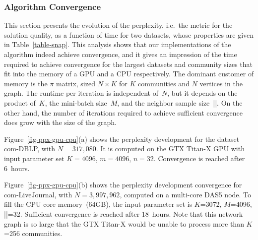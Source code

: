 
\begin{comment}
\begin{figure}[t]	%
  \centering
  \epsfig{file=plots/ppx-gpu.eps, width=\columnwidth}
  \caption{Perplexity convergence of com-DBLP on the GTX~Titan-X~GPU. Number
  of communities chosen to maximally fill the GPU memory.}
  \label{fig-ppx-gpu}
\end{figure}

\begin{figure}[t]	%
  \centering
  \epsfig{file=plots/ppx-cpu.eps, width=\columnwidth}
  \caption{Perplexity convergence of com-LiveJournal on the multi-core~CPU.
  Number of communities chosen to maximally fill the CPU memory.}
  \label{fig-ppx-cpu}
\end{figure}
\end{comment}

\begin{figure*}[t]	%
  \centering
  \caption{Perplexity convergence. (a)~com-DBLP on the GTX~Titan-X~CPU.
  (b)~com-LiveJournal on the multi-core~CPU. Number of communities chosen to
  maximally fill the memory of GPU and CPU respectively.}
  \label{fig-ppx-gpu-cpu}
\end{figure*}

\subsubsection{Algorithm Convergence}

This section presents the evolution of the perplexity, i.e.\ the metric for
the solution quality, as a function of time for
two datasets, whose properties are given in Table~\ref{table-snap}. This
analysis shows that our implementations of the algorithm indeed achieve
convergence, and it gives an impression of the time required to achieve
convergence for the largest datasets and community sizes that fit into the memory
of a GPU and a CPU respectively. The dominant customer of memory is the
$\pi$ matrix, sized $N{\times}K$ for $K$ communities and $N$ vertices in the
graph. The runtime per iteration is independent of~$N$, but it depends on the
product of~$K$, the mini-batch size~$M$, and the neighbor sample size~|\Neighbors|. On
the other hand, the number of iterations required to achieve sufficient
convergence does grow with the size of the graph.

Figure~\ref{fig-ppx-gpu-cpu}(a) shows the perplexity development for the dataset
com-DBLP, with $N=317,080$. It is computed on the GTX Titan-X GPU with input
parameter set $K=4096$, $m=4096$, $n=32$. Convergence is reached after 6~hours.

Figure~\ref{fig-ppx-gpu-cpu}(b) shows the perplexity development convergence for
com-LiveJournal, with $N=3,997,962$, computed on a multi-core DAS5 node.
To fill the CPU core memory~(64GB), the input parameter set is $K$=3072,
$M$=4096, |\Neighbors|=32. Sufficient convergence is reached after 18~hours. Note
that this network graph is so large that the GTX Titan-X would be unable to
process more than $K$=256 communities.
